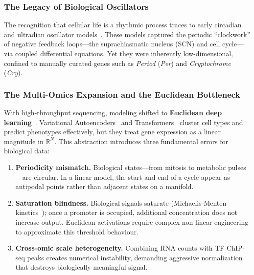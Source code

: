 \documentclass[preprint,12pt,amsmath,amssymb,superscriptaddress,floatfix]{revtex4-2}
\newcommand{\reals}{\mathbb{R}}
\begin{document}
\subsubsection{The Legacy of Biological Oscillators}

The recognition that cellular life is a rhythmic process traces to early
circadian and ultradian oscillator
models~\cite{goodwin1965oscillatory,goldbeter1995model}.
These models captured the periodic ``clockwork'' of negative feedback
loops---the suprachiasmatic nucleus (SCN) and cell cycle---via coupled
differential equations.
Yet they were inherently low-dimensional, confined to manually curated
genes such as \textit{Period} (\textit{Per}) and
\textit{Cryptochrome} (\textit{Cry}).

\subsubsection{The Multi-Omics Expansion and the Euclidean Bottleneck}

With high-throughput sequencing, modeling shifted to \textbf{Euclidean deep
learning}~\cite{ref_031,ref_032,ref_033,ref_034,ref_035,ref_036,ref_037,ref_038,ref_039,ref_040}.
Variational Autoencoders~\cite{kingma2013auto} and
Transformers~\cite{vaswani2017attention} cluster cell types and predict
phenotypes effectively, but they treat gene expression as a linear magnitude
in $\reals^N$.
This abstraction introduces three fundamental errors for biological data:

\begin{enumerate}
    \item \textbf{Periodicity mismatch.}
    Biological states---from mitosis to metabolic pulses---are circular.
    In a linear model, the start and end of a cycle appear as antipodal
    points rather than adjacent states on a manifold.

    \item \textbf{Saturation blindness.}
    Biological signals saturate (Michaelis-Menten kinetics~\cite{michaelis1913die});
    once a promoter is occupied, additional concentration does not increase
    output. Euclidean activations require complex non-linear engineering to
    approximate this threshold behaviour.

    \item \textbf{Cross-omic scale heterogeneity.}
    Combining RNA counts with TF ChIP-seq peaks creates numerical instability,
    demanding aggressive normalization that destroys biologically meaningful signal.
\end{enumerate}
\end{document}
